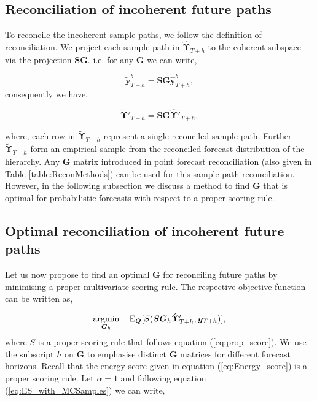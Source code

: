 \documentclass[12pt]{article}
\def\E{\text{E}}
\theoremstyle{definition}
\begin{document}
\subsection{Reconciliation of incoherent future paths}

To reconcile the incoherent sample paths, we follow the definition of reconciliation. We project each sample path in $\hat{\bm{\Upsilon}}_{T+h}$ to the coherent subspace via the projection $\bm{SG}$. i.e. for any $\bm{G}$ we can write,

\begin{equation} \label{eq:sampleRecon_1}
\tilde{\bm{y}}_{T+h}^b = \bm{SG}\hat{\bm{y}}_{T+h}^b,
\end{equation}
consequently we have,

\begin{equation} \label{eq:sampleRecon_2}
\tilde{\bm{\Upsilon}}'_{T+h} = \bm{SG}\hat{\bm{\Upsilon}}'_{T+h},
\end{equation}

where, each row in $\tilde{\bm{\Upsilon}}_{T+h}$ represent a single reconciled sample path. Further $\tilde{\bm{\Upsilon}}_{T+h}$ form an empirical sample from the reconciled forecast distribution of the hierarchy. Any $\bm{G}$ matrix introduced in point forecast reconciliation (also given in Table \ref{table:ReconMethods}) can be used for this sample path reconciliation. However, in the following subsection we discuss a method to find $\bm{G}$ that is optimal for probabilistic forecasts with respect to a proper scoring rule.

\subsection{Optimal reconciliation of incoherent future paths}\label{subsec:Optimal_recon}

Let us now propose to find an optimal $\bm{G}$ for reconciling future paths by minimising a proper multivariate scoring rule. The respective objective function can be written as,

\begin{equation} \label{eq:Obj_func_1}
\operatornamewithlimits{argmin}_{\bm{G}_h} \quad \E_{\bm{Q}}[S(\bm{SG}_h\hat{\bm{\Upsilon}}'_{T+h}, \bm{y}_{T+h})],
\end{equation}
where $S$ is a proper scoring rule that follows equation (\ref{eq:prop_score}). We use the subscript $h$ on $\bm{G}$ to emphasise distinct $\bm{G}$ matrices for different forecast horizons. Recall that the energy score given in equation (\ref{eq:Energy_score}) is a proper scoring rule. Let $\alpha = 1$ and following equation (\ref{eq:ES_with_MCSamples}) we can write,
\end{document}
